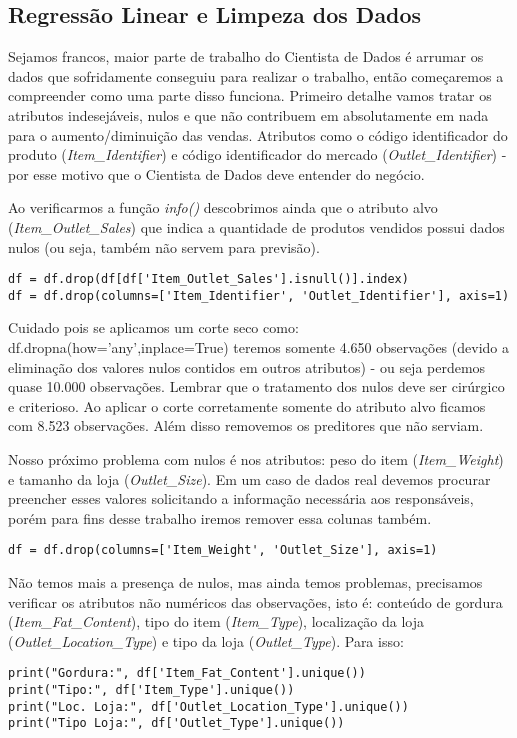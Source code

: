 \subsection{Regressão Linear e Limpeza dos Dados}

Sejamos francos, maior parte de trabalho do Cientista de Dados é arrumar os dados que sofridamente conseguiu para realizar o trabalho, então começaremos a compreender como uma parte disso funciona. Primeiro detalhe vamos tratar os atributos indesejáveis, nulos e que não contribuem em absolutamente em nada para o aumento/diminuição das vendas. Atributos como o código identificador do produto (\textit{Item\_Identifier}) e  código identificador do mercado (\textit{Outlet\_Identifier}) - por esse motivo que o Cientista de Dados deve entender do negócio.

Ao verificarmos a função \textit{info()} descobrimos ainda que o atributo alvo (\textit{Item\_Outlet\_Sales}) que indica a quantidade de produtos vendidos possui dados nulos (ou seja, também não servem para previsão).
\begin{lstlisting}[]
df = df.drop(df[df['Item_Outlet_Sales'].isnull()].index)
df = df.drop(columns=['Item_Identifier', 'Outlet_Identifier'], axis=1)
\end{lstlisting}

Cuidado pois se aplicamos um corte seco como: {\ttfamily df.dropna(how='any',inplace=True)} teremos somente 4.650 observações (devido a eliminação dos valores nulos contidos em outros atributos) - ou seja perdemos quase 10.000 observações. Lembrar que o tratamento dos nulos deve ser cirúrgico e criterioso. Ao aplicar o corte corretamente somente do atributo alvo ficamos com 8.523 observações. Além disso removemos os preditores que não serviam.

Nosso próximo problema com nulos é nos atributos: peso do item (\textit{Item\_Weight}) e tamanho da loja (\textit{Outlet\_Size}). Em um caso de dados real devemos procurar preencher esses valores solicitando a informação necessária aos responsáveis, porém para fins desse trabalho iremos remover essa colunas também.
\begin{lstlisting}[]
df = df.drop(columns=['Item_Weight', 'Outlet_Size'], axis=1)
\end{lstlisting}

Não temos mais a presença de nulos, mas ainda temos problemas, precisamos verificar os atributos não numéricos das observações, isto é: conteúdo de gordura (\textit{Item\_Fat\_Content}), tipo do item (\textit{Item\_Type}), localização da loja (\textit{Outlet\_Location\_Type}) e tipo da loja (\textit{Outlet\_Type}). Para isso:
\begin{lstlisting}[]
print("Gordura:", df['Item_Fat_Content'].unique())
print("Tipo:", df['Item_Type'].unique())
print("Loc. Loja:", df['Outlet_Location_Type'].unique())
print("Tipo Loja:", df['Outlet_Type'].unique())
\end{lstlisting}

